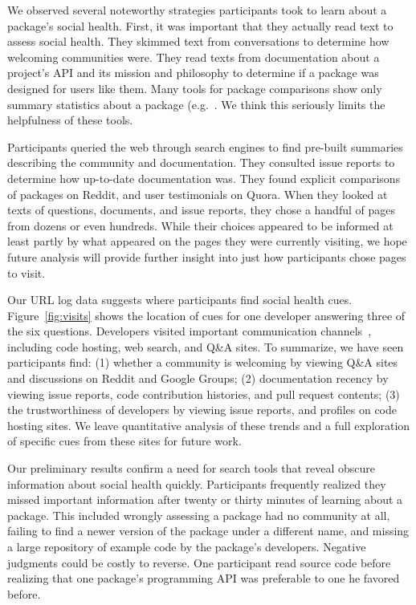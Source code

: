 We observed several noteworthy strategies participants took to learn about a package's social health.
First, it was important that they actually read text to assess social health.
They skimmed text from conversations to determine how welcoming communities were.
They read texts from documentation about a project's API and its mission and philosophy to determine if a package was designed for users like them.
Many tools for package comparisons show only summary statistics about a package (e.g.~\cite{awesome_python,ruby_toolbox}.
We think this seriously limits the helpfulness of these tools.

Participants queried the web through search engines to find pre-built summaries describing the community and documentation.
They consulted issue reports to determine how up-to-date documentation was.
They found explicit comparisons of packages on Reddit, and user testimonials on Quora.
When they looked at texts of questions, documents, and issue reports, they chose a handful of pages from dozens or even hundreds.
While their choices appeared to be informed at least partly by what appeared on the pages they were currently visiting, we hope future analysis will provide further insight into just how participants chose pages to visit.

Our URL log data suggests where participants find social health cues.
Figure~\ref{fig:visits} shows the location of cues for one developer answering three of the six questions.
Developers visited important communication channels~\cite{storey_revolution_2014}, including code hosting, web search, and Q\&A sites.
To summarize, we have seen participants find:
(1) whether a community is welcoming by viewing Q\&A sites and discussions on Reddit and Google Groups;
(2) documentation recency by viewing issue reports, code contribution histories, and pull request contents;
(3) the trustworthiness of developers by viewing issue reports, and profiles on code hosting sites.
We leave quantitative analysis of these trends and a full exploration of specific cues from these sites for future work.

Our preliminary results confirm a need for search tools that reveal obscure information about social health quickly.
Participants frequently realized they missed important information after twenty or thirty minutes of learning about a package.
This included wrongly assessing a package had no community at all, failing to find a newer version of the package under a different name, and missing a large repository of example code by the package's developers.
Negative judgments could be costly to reverse.
One participant read source code before realizing that one package's programming API was preferable to one he favored before.

